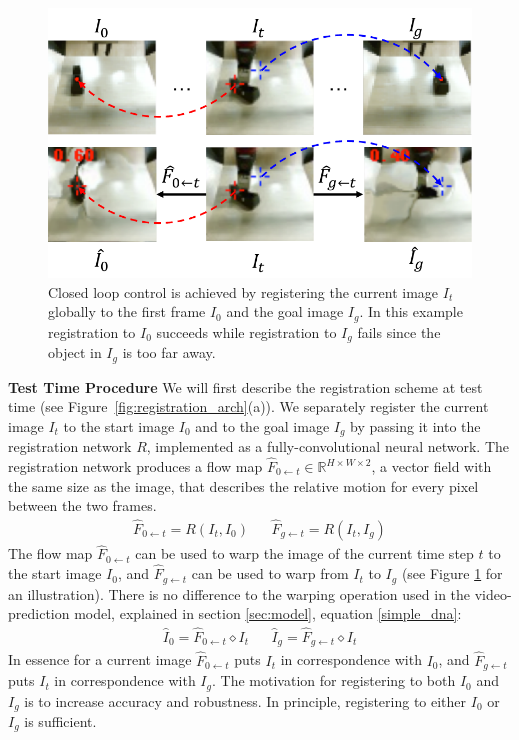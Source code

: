 \begin{figure}
	\centering
	\includegraphics[width=0.8\linewidth]{images_rfr/registration_singletime.pdf}
	\caption{\small{Closed loop control is achieved by registering the current image $I_t$ globally to the first frame $I_0$ and the goal image $I_g$. In this example registration to $I_0$ succeeds while registration to $I_g$ fails since the object in $I_g$ is too far away.}
		\label{fig:reg_single}
	}
\end{figure}

\textbf{Test Time Procedure}
We will first describe the registration scheme at test time (see Figure~\ref{fig:registration_arch}(a)). We separately register the current image $I_t$ to the start image $I_0$ and to the goal image $I_g$ by passing it into the registration network $R$, implemented as a fully-convolutional neural network. The registration network produces a flow map $\hat{F}_{0 \leftarrow t} \in \mathbb{R}^{H \times W \times 2}$, a vector field with the same size as the image, that describes the relative motion for every pixel between the two frames.
\begin{align}
\hat{F}_{0 \leftarrow t} = R(I_t, I_0) &&
\hat{F}_{g \leftarrow t} = R(I_t, I_g)
\end{align}
The flow map $\hat{F}_{0 \leftarrow t}$ can be used to warp the image of the current time step $t$ to the start image $I_0$, and $\hat{F}_{g \leftarrow t}$ can be used to warp from $I_t$ to $I_g$ (see Figure \ref{fig:reg_single} for an illustration). There is no difference to the warping operation used in the video-prediction model, explained in section \ref{sec:model}, equation \ref{simple_dna}:
\begin{align}
\hat{I}_0 = \hat{F}_{0 \leftarrow t} \diamond  I_t &&
\hat{I}_g = \hat{F}_{g \leftarrow t} \diamond  I_t 
\end{align}
In essence for a current image $\hat{F}_{0 \leftarrow t}$ puts $I_t$ in correspondence with $I_0$, and $\hat{F}_{g \leftarrow t}$ puts $I_t$ in correspondence with $I_g$. The motivation for registering to both $I_0$ and $I_g$ is to increase accuracy and robustness. In principle, registering to either $I_0$ or $I_g$ is sufficient.

